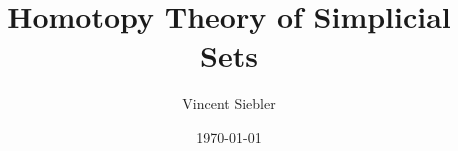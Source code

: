 \documentclass{article}
\title{Homotopy Theory of Simplicial Sets}
\author{Vincent Siebler}
\date{\today}
\begin{document}
\maketitle
\tableofcontents




   









































%

{}

\end{document}
